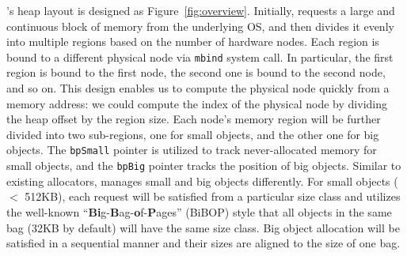 \NM{}'s heap layout is designed as  Figure~\ref{fig:overview}. Initially, \NM{} requests a large and continuous block of memory from the underlying OS, and then divides it evenly into multiple regions based on the number of hardware nodes. Each region is bound to a different physical node via \texttt{mbind} system call. 
In particular, the first region is bound to the first node, the second one is bound to the second node, and so on. This design enables us to compute the physical node quickly from a memory address: we could compute the index of the physical node by dividing the heap offset by the region size. 
Each node's memory region will be further divided into two sub-regions, one for small objects, and the other one for big objects. The \texttt{bpSmall} pointer is utilized to track never-allocated memory
for small objects, and the \texttt{bpBig} pointer tracks the position of big objects. Similar to existing allocators, \NM{} manages small and big objects differently. 
For small objects ($<$ 512KB), each request will be satisfied from a particular size class
and \NM{} utilizes the well-known ``\textbf{Bi}g-\textbf{B}ag-\textbf{o}f-\textbf{P}ages'' (BiBOP) style that all objects in the same bag (32KB by default) will have the same size class. 
Big object allocation will be satisfied in a sequential manner and their sizes are aligned to the size of one bag.


